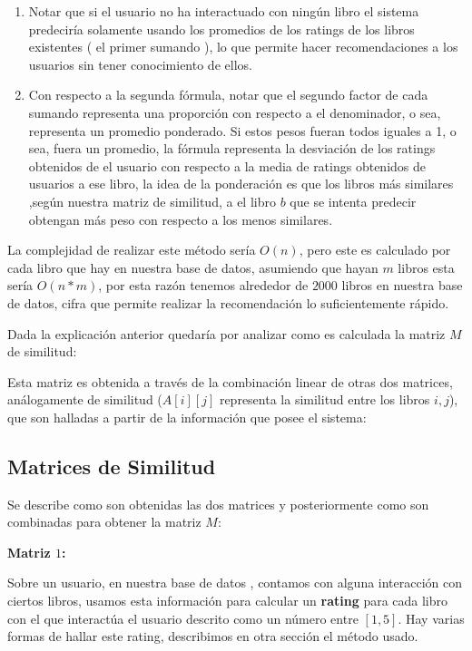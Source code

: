 \documentclass[14pt]{extarticle}
\begin{document}
\begin{enumerate}
    \item Notar que si el usuario no ha interactuado con ningún libro el sistema predeciría solamente usando los promedios de los ratings de los libros existentes ( el primer sumando ), lo que permite hacer recomendaciones a los usuarios sin tener conocimiento de ellos.
    \item Con respecto a la segunda fórmula, notar que el segundo factor de cada sumando representa una proporción con respecto a el denominador, o sea, representa un promedio ponderado. Si estos pesos fueran todos iguales a 1, o sea, fuera un promedio, la fórmula representa la desviación de los ratings obtenidos de el usuario con respecto a la media de ratings obtenidos de usuarios a ese libro, la idea de la ponderación es que los libros más similares ,según nuestra matriz de similitud, a el libro $b$ que se intenta predecir obtengan más peso con respecto a los menos similares. 
\end{enumerate}

La complejidad de realizar este método sería $O(n)$, pero este es calculado por cada libro que hay en nuestra base de datos, asumiendo que hayan $m$ libros esta sería $O(n * m)$, por esta razón tenemos alrededor de $2000$ libros en nuestra base de datos, cifra que permite realizar la recomendación lo suficientemente rápido.

Dada la explicación anterior quedaría por analizar como es calculada la matriz $M$ de similitud:

Esta matriz es obtenida a través de la combinación linear de otras dos matrices, análogamente de similitud ($A[i][j]$ representa la similitud entre los libros $i, j$), que son halladas a partir de la información que posee el sistema:

\subsection{Matrices de Similitud}

Se describe como son obtenidas las dos matrices y posteriormente como son combinadas para obtener la matriz $M$:

\textbf{Matriz $1$:}

Sobre un usuario, en nuestra base de datos , contamos con alguna interacción con ciertos libros, usamos esta información para calcular un \textbf{rating} para cada libro con el que interactúa el usuario descrito como un número entre $[1,5]$. Hay varias formas de hallar este rating, describimos en otra sección el método usado. 
\end{document}
